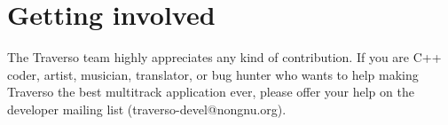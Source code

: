 
\section{Getting involved}
The Traverso team highly appreciates any kind of contribution. If you are C++ coder, artist, musician, translator, or bug hunter who wants to help making Traverso the best multitrack application ever, please offer your help on the developer mailing list (traverso-devel@nongnu.org).


